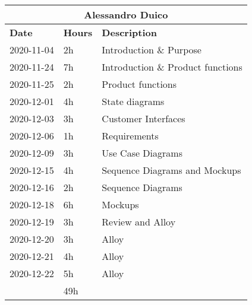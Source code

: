 \begin{table}[H]
    \centering
    \begin{tabular}{|l|l|l|}
        \multicolumn{3}{c}{\textbf{Alessandro Duico}}                      \\
        \hline
        \textbf{Date} & \textbf{Hours} & \textbf{Description}              \\\hline
        2020-11-04    & 2h             & Introduction \& Purpose           \\\hline
        2020-11-24    & 7h             & Introduction \& Product functions \\\hline
        2020-11-25    & 2h             & Product functions                 \\\hline
        2020-12-01    & 4h             & State diagrams                    \\\hline
        2020-12-03    & 3h             & Customer Interfaces               \\\hline
        2020-12-06    & 1h             & Requirements                      \\\hline
        2020-12-09    & 3h             & Use Case Diagrams                 \\\hline
        2020-12-15    & 4h             & Sequence Diagrams and Mockups     \\\hline
        2020-12-16    & 2h             & Sequence Diagrams                 \\\hline
        2020-12-18    & 6h             & Mockups                           \\\hline
        2020-12-19    & 3h             & Review and Alloy                  \\\hline
        2020-12-20    & 3h             & Alloy                             \\\hline
        2020-12-21    & 4h             & Alloy                             \\\hline
        2020-12-22    & 5h             & Alloy                             \\\hline\hline
                      & 49h            &                                   \\\hline
    \end{tabular}
\end{table}
